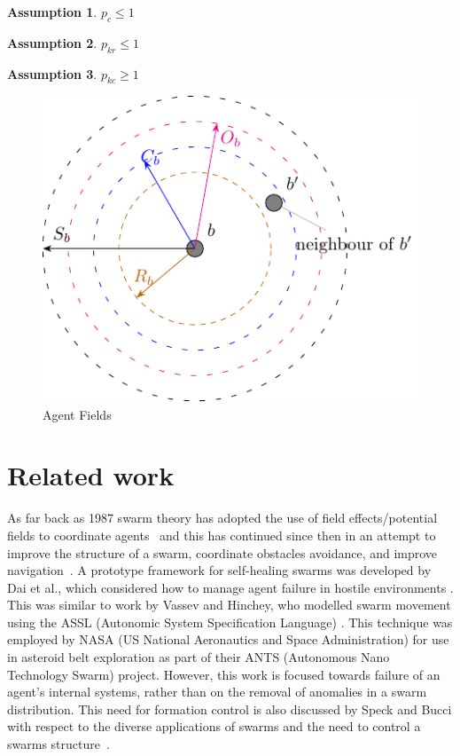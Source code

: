 \documentclass[12pt,a4paper]{IEEEtran}
\newtheorem{assumption}{Assumption}
\begin{document}
\begin{assumption}
	$p_c \leq 1$
\end{assumption}
\begin{assumption}
	$p_{kr} \leq 1$
\end{assumption}
\begin{assumption}
	$p_{kc} \geq 1$
\end{assumption}
\begin{figure}[H]
	\centering
	\includegraphics[width=0.8\linewidth]{figures/stableswarm}
	\caption[Agent Fields]{Agent Fields}
	\label{fig:stableswarm}
\end{figure}

\section{Related work}

As far back as 1987 swarm theory has adopted the use of field effects/potential fields to coordinate agents~\cite{REY:87} and this has continued since then in an attempt to improve the structure of a swarm, coordinate obstacles avoidance, and improve navigation~\cite{BAFVM:06,BAF:06,BFV:07,BM:09,eliot2018metric,VG:05,HC:09,SW:03,Son2017}. A prototype framework for self-healing swarms was developed by Dai et al., which considered how to manage agent failure in hostile environments \cite{DHMRZ:06}. This was similar to work by Vassev and Hinchey, who modelled swarm movement using the ASSL (Autonomic System Specification Language) \cite{VH:09}. This technique was employed by NASA (US National Aeronautics and Space Administration) for use in asteroid belt exploration as part of their ANTS (Autonomous Nano Technology Swarm) project. However, this work is focused towards failure of an agent's internal systems, rather than on the removal of anomalies in a swarm distribution. This need for formation control is also discussed by Speck and Bucci with respect to the diverse applications of swarms and the need to control a swarms structure~\cite{8430773}.
\end{document}
